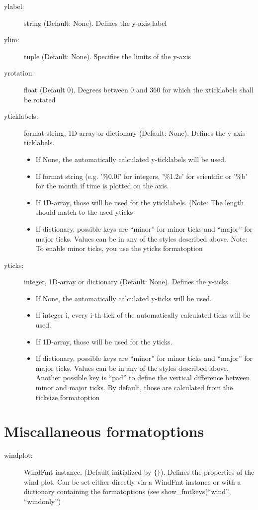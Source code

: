\begin{description}
    \item[\gls*{ylabel}:] \label{item:ylabel}  string (Default: None). Defines the y-axis label
    \item[\gls*{ylim}:] \label{item:ylim}  tuple (Default: None). Specifies the limits of the y-axis
    \item[\gls*{yrotation}:] \label{item:yrotation}  float (Default 0). Degrees between 0 and 360 for which the xticklabels shall be rotated
    \item[\gls*{yticklabels}:] \label{item:yticklabels}  format string, 1D-array or dictionary (Default: None). Defines the y-axis ticklabels.
\begin{itemize}
    \item If None, the automatically calculated y-ticklabels will be used.
    \item If format string (e.g. '\%0.0f' for integers, '\%1.2e' for scientific or '\%b' for the month if time is plotted on the axis.
    \item If 1D-array, those will be used for the yticklabels. (Note: The length should match to the used yticks
    \item If dictionary, possible keys are \enquote{minor} for minor ticks and \enquote{major} for major ticks. Values can be in any of the styles described above. Note: To enable minor ticks, you use the yticks formatoption
\end{itemize}

    \item[\gls*{yticks}:] \label{item:yticks}  integer, 1D-array or dictionary (Default: None). Defines the y-ticks.
\begin{itemize}
    \item If None, the automatically calculated y-ticks will be used.
    \item If integer i, every i-th tick of the automatically calculated ticks will be used.
    \item If 1D-array, those will be used for the yticks.
    \item If dictionary, possible keys are \enquote{minor} for minor ticks and \enquote{major} for major ticks. Values can be in any of the styles described above. Another possible key is \enquote{pad} to define the vertical difference between minor and major ticks. By default, those are calculated from the ticksize formatoption
\end{itemize}

\end{description}

\section{Miscallaneous formatoptions}
\begin{description}
    \item[\gls*{windplot}:] \label{item:windplot} 
        WindFmt instance. (Default initialized by $\lbrace\rbrace$). Defines the properties
        of the wind plot. Can be set either directly via a WindFmt instance or
        with a dictionary containing the formatoptions  (see
        show\_fmtkeys(\enquote{wind}, \enquote{windonly})
\end{description}

